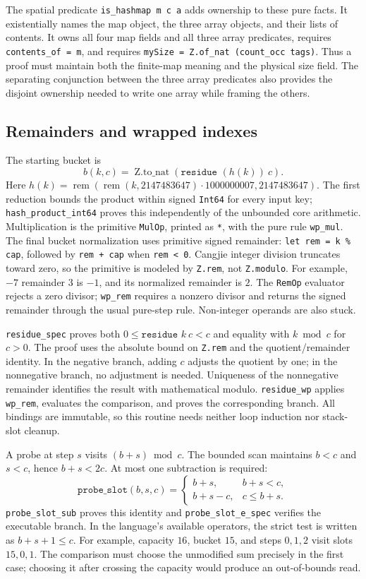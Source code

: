 \documentclass[11pt]{article}
\begin{document}
The spatial predicate \texttt{is\_hashmap m c a} adds ownership to these pure
facts. It existentially names the map object, the three array objects, and their
lists of contents. It owns all four map fields and all three array predicates,
requires \texttt{contents\_of = m}, and requires
\texttt{mySize = Z.of\_nat (count\_occ tags)}. Thus a proof must maintain both
the finite-map meaning and the physical size field. The separating conjunction
between the three array predicates also provides the disjoint ownership needed
to write one array while framing the others.

\subsection{Remainders and wrapped indexes}

The starting bucket is
\[
 b(k,c)=\operatorname{Z.to\_nat}(\texttt{residue }(h(k))\ c).
\]
Here $h(k)=\operatorname{rem}(\operatorname{rem}(k,2147483647)
\cdot1000000007,2147483647)$. The first reduction bounds the product within
signed \texttt{Int64} for every input key; \texttt{hash\_product\_int64}
proves this independently of the unbounded core arithmetic. Multiplication
is the primitive \texttt{MulOp}, printed as \texttt{*}, with the pure rule
\texttt{wp\_mul}. The final bucket normalization uses primitive signed remainder:
\texttt{let rem = k \% cap}, followed by \texttt{rem + cap} when
\texttt{rem < 0}. Cangjie integer division truncates toward zero, so the
primitive is modeled by \texttt{Z.rem}, not \texttt{Z.modulo}.
For example, $-7$ remainder $3$ is $-1$, and its normalized remainder is $2$.
The \texttt{RemOp} evaluator rejects a zero divisor; \texttt{wp\_rem}
requires a nonzero divisor and returns the signed remainder through the
usual pure-step rule. Non-integer operands are also stuck.

\texttt{residue\_spec} proves both
$0\leq\texttt{residue }k\ c<c$ and equality with $k\bmod c$ for $c>0$.
The proof uses the absolute bound on \texttt{Z.rem} and the quotient/remainder
identity. In the negative branch, adding $c$ adjusts the quotient by one;
in the nonnegative branch, no adjustment is needed. Uniqueness of the
nonnegative remainder identifies the result with mathematical modulo.
\texttt{residue\_wp} applies \texttt{wp\_rem}, evaluates the comparison,
and proves the corresponding branch. All bindings are immutable, so this
routine needs neither loop induction nor stack-slot cleanup.

A probe at step $s$ visits $(b+s)\bmod c$. The bounded scan maintains
$b<c$ and $s<c$, hence $b+s<2c$. At most one subtraction is required:
\[
 \texttt{probe\_slot}(b,s,c)=
 \begin{cases}b+s,&b+s<c,\\b+s-c,&c\leq b+s.\end{cases}
\]
\texttt{probe\_slot\_sub} proves this identity and
\texttt{probe\_slot\_e\_spec} verifies the executable branch. In the language's
available operators, the strict test is written as $b+s+1\leq c$. For example,
capacity $16$, bucket $15$, and steps $0,1,2$ visit slots $15,0,1$.
The comparison must choose the unmodified sum precisely in the first case;
choosing it after crossing the capacity would produce an out-of-bounds read.
\end{document}
